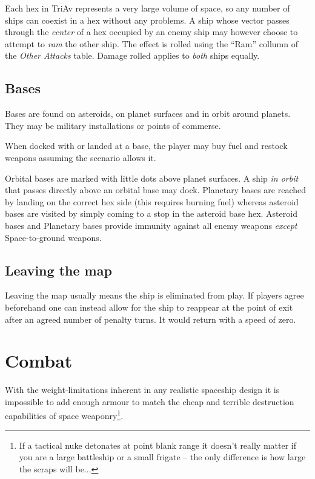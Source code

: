 \documentclass[a4paper,12pt,notitlepage,twocolumn]{article}
\begin{document}
Each hex in TriAv represents a very large volume of space, so any
number of ships can coexist in a hex without any problems. A ship whose
vector passes through the \emph{center} of a hex occupied by an enemy
ship may however choose to attempt to \emph{ram} the other ship. The
effect is rolled using the ``Ram'' collumn of the \emph{Other Attacks}
table. Damage rolled applies to \emph{both} ships equally. 

\subsection{Bases}

Bases are found on asteroids, on planet surfaces and in orbit around
planets. They may be military installations or points of commerse. 

When docked with or landed at a base, the player may buy fuel and
restock weapons assuming the scenario allows it. 

Orbital bases are marked with little dots above planet surfaces. A ship \emph{in
  orbit} that passes directly above an orbital base may
dock. Planetary bases are reached by landing on the correct hex side
(this requires burning fuel) whereas asteroid bases are visited by
simply coming to a stop in the asteroid base hex. Asteroid bases and
Planetary bases provide immunity against all enemy weapons \emph{except}
Space-to-ground weapons.  

\subsection{Leaving the map}

Leaving the map usually means the ship is eliminated from play. If
players agree beforehand one can instead allow for the ship to reappear at the
point of exit after an agreed number of penalty turns. It would return
with a speed of zero.  


\section{Combat}
\label{sec:combat}

With the weight-limitations inherent in any realistic spaceship design it is
impossible to add enough armour to match the cheap and terrible destruction
capabilities of space weaponry\footnote{If a tactical nuke detonates at point blank
range it doesn't really matter if you are a large battleship or a small frigate
-- the only difference is how large the scraps will be...}.
\end{document}
